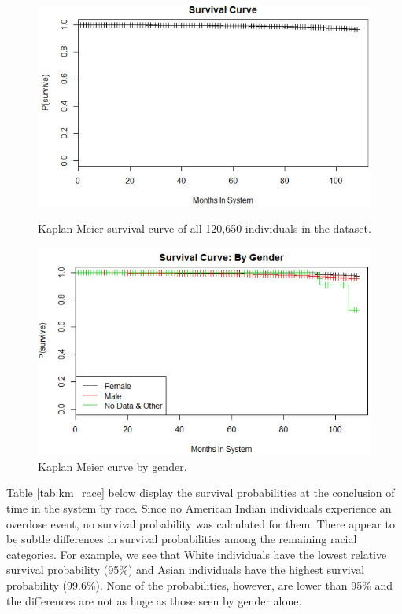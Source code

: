 \documentclass[twoside,10.5pt]{article}
\begin{document}
\begin{figure}[h!]
\centering
\begin{minipage}{.5\textwidth}
  \centering
  \includegraphics[width=1\linewidth]{images/kaplan_meier.JPG}
  \caption{Kaplan Meier survival curve of all 120,650 individuals in the dataset.}
  \label{fig:km_original}
\end{minipage}%
\begin{minipage}{.5\textwidth}
  \centering
  \includegraphics[width=1\linewidth]{images/kaplan_meier_gender.JPG}
  \caption{Kaplan Meier curve by gender.}
  \label{fig:km_gender}
\end{minipage}
\end{figure}

Table \ref{tab:km_race} below display the survival probabilities at the conclusion of time in the system by race. Since no American Indian individuals experience an overdose event, no survival probability was calculated for them. There appear to be subtle differences in survival probabilities among the remaining racial categories. For example, we see that White individuals have the lowest relative survival probability (95\%) and Asian individuals have the highest survival probability (99.6\%). None of the probabilities, however, are lower than 95\% and the differences are not as huge as those seen by gender alone. 
\end{document}
